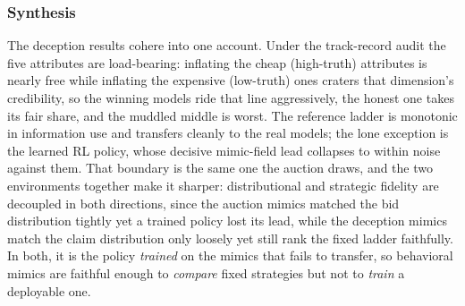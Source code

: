 \subsubsection{Synthesis}
The deception results cohere into one account. Under the track-record audit the five attributes are load-bearing: inflating the cheap (high-truth) attributes is nearly free while inflating the expensive (low-truth) ones craters that dimension's credibility, so the winning models ride that line aggressively, the honest one takes its fair share, and the muddled middle is worst. The reference ladder is monotonic in information use and transfers cleanly to the real models; the lone exception is the learned RL policy, whose decisive mimic-field lead collapses to within noise against them. That boundary is the same one the auction draws, and the two environments together make it sharper: distributional and strategic fidelity are decoupled in both directions, since the auction mimics matched the bid distribution tightly yet a trained policy lost its lead, while the deception mimics match the claim distribution only loosely yet still rank the fixed ladder faithfully. In both, it is the policy \emph{trained} on the mimics that fails to transfer, so behavioral mimics are faithful enough to \emph{compare} fixed strategies but not to \emph{train} a deployable one.

